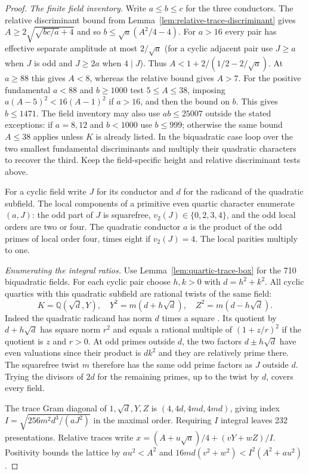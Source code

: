 \documentclass[11pt,reqno]{amsart}
\theoremstyle{remark}\newtheorem{remark}[theorem]{Remark}
\numberwithin{equation}{section}
\begin{document}
\begin{proof}
\smallskip\noindent\emph{The finite field inventory.}
Write $a\le b\le c$ for the three conductors. The relative
discriminant bound from Lemma~\ref{lem:relative-trace-discriminant}
gives $A\ge2\sqrt{\sqrt{bc/a}+4}$ and so $b\le\sqrt a(A^2/4-4)$.
For $a>16$ every pair has effective separate amplitude at most
$2/\sqrt a$ (for a cyclic adjacent pair use $J\ge a$ when $J$ is odd and $J\ge2a$ when $4\mid J$). Thus
$A<1+2/(1/2-2/\sqrt a)$. At $a\ge88$ this gives $A<8$, whereas
the relative bound gives $A>7$. For the positive fundamental
$a<88$ and $b\ge1000$ test $5\le A\le38$, imposing
$a(A-5)^2<16(A-1)^2$ if $a>16$, and then the bound on $b$.
This gives $b\le1471$. The field inventory may also use
$ab\le25007$ outside the stated exceptions: if $a=8,12$ and
$b<1000$ use $b\le999$; otherwise the same bound $A\le38$
applies unless $K$ is already listed. In the biquadratic case
loop over the two smallest fundamental discriminants and multiply
their quadratic characters to recover the third. Keep the
field-specific height and relative discriminant tests above.

For a cyclic field write $J$ for its conductor and $d$ for the
radicand of the quadratic subfield. The local components of a
primitive even quartic character enumerate $(a,J)$: the odd part of
$J$ is squarefree, $v_2(J)\in\{0,2,3,4\}$, and the odd local orders
are two or four. The quadratic conductor $a$ is the product of the
odd primes of local order four, times eight if $v_2(J)=4$.
The local parities multiply to one.

\smallskip\noindent\emph{Enumerating the integral ratios.}
Use Lemma~\ref{lem:quartic-trace-box} for the 710 biquadratic
fields. For each cyclic pair choose $h,k>0$ with $d=h^2+k^2$.
All cyclic quartics with this quadratic subfield are rational twists
of the same field:
\[
 K=\mathbb Q(\sqrt d,Y),\quad
 Y^2=m(d+h\sqrt d),\quad Z^2=m(d-h\sqrt d).
\]
Indeed the quadratic radicand has norm $d$ times a square
\cite[pp.~145--146]{HudsonWilliams}. Its quotient by $d+h\sqrt d$
has square norm $r^2$ and equals a rational multiple of
$(1+z/r)^2$ if the quotient is $z$ and $r>0$.
At odd primes outside $d$, the two factors $d\pm h\sqrt d$
have even valuations since their product is $dk^2$ and they are
relatively prime there. The squarefree twist $m$ therefore has the
same odd prime factors as $J$ outside $d$. Trying the divisors of
$2d$ for the remaining primes, up to the twist by $d$, covers every
field.

The trace Gram diagonal of $1,\sqrt d,Y,Z$ is $(4,4d,4md,4md)$,
giving index $I=\sqrt{256m^2d^3/(aJ^2)}$ in the maximal order.
Requiring $I$ integral leaves 232 presentations. Relative traces
write $x=(A+u\sqrt a)/4+(vY+wZ)/I$. Positivity bounds the lattice
by $au^2<A^2$ and $16md(v^2+w^2)<I^2(A^2+au^2)$.


\end{proof}
\end{document}
